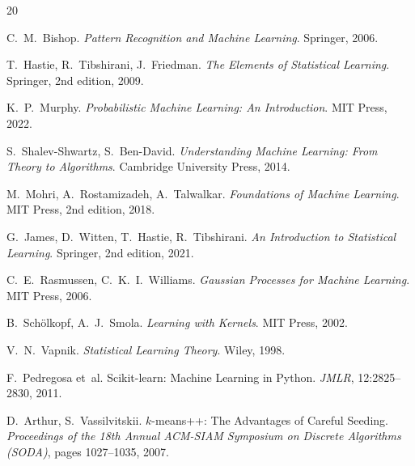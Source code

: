 \documentclass[12pt,a4paper,twoside]{book}
\theoremstyle{definition}
\theoremstyle{plain}
\theoremstyle{remark}
\begin{document}

\begin{thebibliography}{20}

C.~M.~Bishop.
\newblock \emph{Pattern Recognition and Machine Learning}.
\newblock Springer, 2006.

T.~Hastie, R.~Tibshirani, J.~Friedman.
\newblock \emph{The Elements of Statistical Learning}.
\newblock Springer, 2nd edition, 2009.

K.~P.~Murphy.
\newblock \emph{Probabilistic Machine Learning: An Introduction}.
\newblock MIT Press, 2022.

S.~Shalev-Shwartz, S.~Ben-David.
\newblock \emph{Understanding Machine Learning: From Theory to Algorithms}.
\newblock Cambridge University Press, 2014.

M.~Mohri, A.~Rostamizadeh, A.~Talwalkar.
\newblock \emph{Foundations of Machine Learning}.
\newblock MIT Press, 2nd edition, 2018.

G.~James, D.~Witten, T.~Hastie, R.~Tibshirani.
\newblock \emph{An Introduction to Statistical Learning}.
\newblock Springer, 2nd edition, 2021.

C.~E.~Rasmussen, C.~K.~I.~Williams.
\newblock \emph{Gaussian Processes for Machine Learning}.
\newblock MIT Press, 2006.

B.~Sch\"olkopf, A.~J.~Smola.
\newblock \emph{Learning with Kernels}.
\newblock MIT Press, 2002.

V.~N.~Vapnik.
\newblock \emph{Statistical Learning Theory}.
\newblock Wiley, 1998.

F.~Pedregosa et~al.
\newblock Scikit-learn: Machine Learning in Python.
\newblock \emph{JMLR}, 12:2825--2830, 2011.

D.~Arthur, S.~Vassilvitskii.
\newblock $k$-means++: The Advantages of Careful Seeding.
\newblock \emph{Proceedings of the 18th Annual ACM-SIAM Symposium on Discrete Algorithms (SODA)}, pages 1027--1035, 2007.

\end{thebibliography}

\printindex
\end{document}

